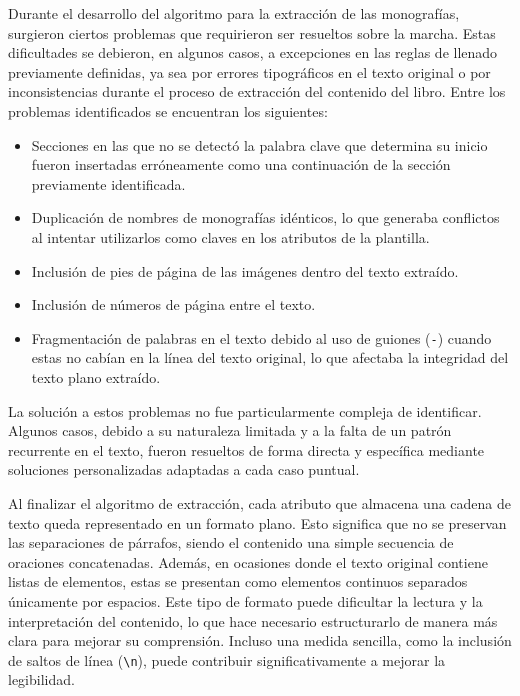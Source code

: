 Durante el desarrollo del algoritmo para la extracción de las monografías, surgieron ciertos problemas que 
requirieron ser resueltos sobre la marcha. Estas dificultades se debieron, en algunos casos, a excepciones 
en las reglas de llenado previamente definidas, ya sea por errores tipográficos en el texto original o por 
inconsistencias durante el proceso de extracción del contenido del libro. Entre los problemas identificados 
se encuentran los siguientes:

\begin{itemize}
    \item Secciones en las que no se detectó la palabra clave que determina su inicio fueron insertadas 
    erróneamente como una continuación de la sección previamente identificada.
    \item Duplicación de nombres de monografías idénticos, lo que generaba conflictos al intentar 
    utilizarlos como claves en los atributos de la plantilla.
    \item Inclusión de pies de página de las imágenes dentro del texto extraído.
    \item Inclusión de números de página entre el texto.
    \item Fragmentación de palabras en el texto debido al uso de guiones (\texttt{-}) cuando estas no 
    cabían en la línea del texto original, lo que afectaba la integridad del texto plano extraído.
\end{itemize}

La solución a estos problemas no fue particularmente compleja de identificar. Algunos casos, debido a su 
naturaleza limitada y a la falta de un patrón recurrente en el texto, fueron resueltos de forma directa 
y específica mediante soluciones personalizadas adaptadas a cada caso puntual.

Al finalizar el algoritmo de extracción, cada atributo que almacena una cadena de texto queda representado 
en un formato plano. Esto significa que no se preservan las separaciones de párrafos, siendo el contenido 
una simple secuencia de oraciones concatenadas. Además, en ocasiones donde el texto original contiene 
listas de elementos, estas se presentan como elementos continuos separados únicamente por espacios. 
Este tipo de formato puede dificultar la lectura y la interpretación del contenido, lo que hace 
necesario estructurarlo de manera más clara para mejorar su comprensión. Incluso una medida sencilla, 
como la inclusión de saltos de línea (\verb|\n|), puede contribuir significativamente a mejorar la legibilidad.

